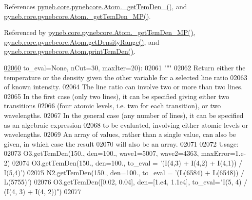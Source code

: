 References \hyperlink{pynebcore_8py_source_l01803}{pyneb.\+core.\+pynebcore.\+Atom.\+\_\+get\+Tem\+Den\+\_()}, and \hyperlink{pynebcore_8py_source_l01980}{pyneb.\+core.\+pynebcore.\+Atom.\+\_\+get\+Tem\+Den\+\_\+\+M\+P()}.



Referenced by \hyperlink{pynebcore_8py_source_l01980}{pyneb.\+core.\+pynebcore.\+Atom.\+\_\+get\+Tem\+Den\+\_\+\+M\+P()}, \hyperlink{pynebcore_8py_source_l01676}{pyneb.\+core.\+pynebcore.\+Atom.\+get\+Density\+Range()}, and \hyperlink{pynebcore_8py_source_l02253}{pyneb.\+core.\+pynebcore.\+Atom.\+print\+Tem\+Den()}.


\begin{DoxyCode}
\hypertarget{classpyneb_1_1core_1_1pynebcore_1_1_atom_l02060}{}\hyperlink{classpyneb_1_1core_1_1pynebcore_1_1_atom_a5e1aa59c92bf62bae8bd756a4405eb25}{02060}                   to\_eval=\textcolor{keywordtype}{None}, nCut=30, maxIter=20):
02061         \textcolor{stringliteral}{"""}
02062 \textcolor{stringliteral}{        Return either the temperature or the density given the other variable for a selected line ratio }
02063 \textcolor{stringliteral}{            of known intensity.}
02064 \textcolor{stringliteral}{        The line ratio can involve two or more than two lines. }
02065 \textcolor{stringliteral}{        In the first case (only two lines), it can be specified giving either two transitions }
02066 \textcolor{stringliteral}{            (four atomic levels, i.e. two for each transition), or two wavelengths.}
02067 \textcolor{stringliteral}{        In the general case (any number of lines), it can be specified as an algebraic expression }
02068 \textcolor{stringliteral}{            to be evaluated, involving either atomic levels or wavelengths.}
02069 \textcolor{stringliteral}{        An array of values, rather than a single value, can also be given, in which case the result }
02070 \textcolor{stringliteral}{            will also be an array.}
02071 \textcolor{stringliteral}{            }
02072 \textcolor{stringliteral}{        Usage: }
02073 \textcolor{stringliteral}{            O3.getTemDen(150., den=100., wave1=5007, wave2=4363, maxError=1.e-2)}
02074 \textcolor{stringliteral}{            O3.getTemDen(150., den=100., to\_eval = '(I(4,3) + I(4,2) + I(4,1)) / I(5,4)')}
02075 \textcolor{stringliteral}{            N2.getTemDen(150., den=100., to\_eval = '(L(6584) + L(6548)) / L(5755)')}
02076 \textcolor{stringliteral}{            O3.getTemDen([0.02, 0.04], den=[1.e4, 1.1e4], to\_eval="I(5, 4) / (I(4, 3) + I(4, 2))")}
02077 \textcolor{stringliteral}{}

\end{DoxyCode}
